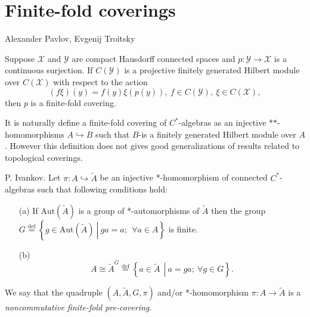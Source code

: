 \documentclass{beamer}
\theoremstyle{plain}
\newcommand{\be}{\begin{equation}}
\newcommand{\ee}{\end{equation}}
\newcommand{\Aut}{\mathrm{Aut}}
\newcommand{\bydef}{\stackrel{\mathrm{def}}{=}}
\newcommand{\hookto}{\hookrightarrow}        %
\begin{document}
\section{Finite-fold coverings}
 \begin{frame}
 	
 	\alert{Alexander Pavlov, Evgenij Troitsky}
 \begin{theorem}
 	Suppose $\mathcal X$ and $\mathcal Y$ are compact Hausdorff connected spaces and $p :\mathcal  Y \to \mathcal X$
 	is a continuous surjection. If $C(\mathcal Y )$ is a projective finitely generated Hilbert module over
 	$C(\mathcal X)$ with respect to the action
 	\begin{equation*}
 		(f\xi)(y) = f(y)\xi(p(y)), ~ f \in  C(\mathcal Y ), ~ \xi \in  C(\mathcal X),
 	\end{equation*}
 	then $p$ is a finite-fold  covering.
 \end{theorem}
  It is naturally define a finite-fold covering of $C^*$-algebras as an injective *$*$-homomorphisms $A\hookto B$ such that $B$-is a finitely generated Hilbert module over
  $A$. However this definition does not gives good generalizations of results  related to topological coverings.
 
 \end{frame}
\begin{frame}
	   \begin{definition}\label{pre_defn} \alert{P. Ivankov}.
	Let $\pi: A \hookto \widetilde{A}$ be an injective *-homomorphism of connected  $C^*$-algebras such that following conditions hold:
	\begin{enumerate}
		\item[(a)] If $\Aut\left(\widetilde{A} \right)$ is a group of *-automorphisms of $\widetilde{A}$ then the group  
		$
		G \bydef \left\{ \left.g \in \Aut\left(\widetilde{A} \right)~\right|~ ga = a;~~\forall a \in A\right\}
		$
		is finite.
		\item[(b)] 	\be\label{cond_b_eqn}
		A \cong \widetilde{A}^G\stackrel{\text{def}}{=}\left\{\left.a\in \widetilde{A}~~\right|~ a = g a;~ \forall g \in G\right\}.\ee
	\end{enumerate}
	We say that the quadruple $\left(A, \widetilde{A}, G, \pi \right)$ and/or *-homomorphism $\pi: A \to \widetilde{A}$   is a \textit{noncommutative finite-fold  pre-covering}. 
\end{definition}

\end{frame}
\end{document}

